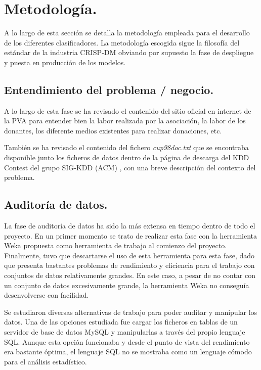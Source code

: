 \section{Metodología.}

A lo largo de esta sección se detalla la metodología empleada para el desarrollo de los diferentes clasificadores. La metodología escogida sigue la filosofía del estándar de la industria CRISP-DM obviando por supuesto la fase de despliegue y puesta en producción de los modelos.

\subsection{Entendimiento del problema / negocio.}

A lo largo de esta fase se ha revisado el contenido del sitio oficial en internet de la PVA para entender bien la labor realizada por la asociación, la labor de los donantes, los diferente medios existentes para realizar donaciones, etc. 

También se ha revisado el contenido del fichero \emph{cup98doc.txt} que se encontraba disponible junto los ficheros de datos dentro de la página de descarga del KDD Contest \cite{KDD-CUP-1998} del grupo SIG-KDD (ACM) \cite{SIGKDD-ACM}, con una breve descripción del contexto del problema.

\subsection{Auditoría de datos.}

La fase de auditoría de datos ha sido la más extensa en tiempo dentro de todo el proyecto. En un primer momento se trato de realizar esta fase con la herramienta Weka \cite{WEKA} propuesta como herramienta de trabajo al comienzo del proyecto. Finalmente, tuvo que descartarse el uso de esta herramienta para esta fase, dado que presenta bastantes problemas de rendimiento y eficiencia para el trabajo con conjuntos de datos relativamente grandes. En este caso, a pesar de no contar con un conjunto de datos excesivamente grande, la herramienta Weka no conseguía desenvolverse con facilidad.

Se estudiaron diversas alternativas de trabajo para poder auditar y manipular los datos. Una de las opciones estudiada fue cargar los ficheros en tablas de un servidor de base de datos MySQL y manipularlas a través del propio lenguaje SQL. Aunque esta opción funcionaba y desde el punto de vista del rendimiento era bastante óptima, el lenguaje SQL no se mostraba como un lenguaje cómodo para el análisis estadístico.

